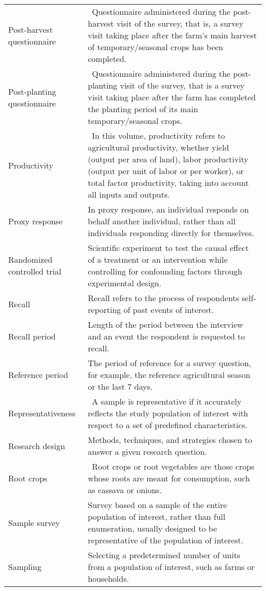 \documentclass[
]{book}
\begin{document}
\begin{longtable}[]{@{}ll@{}}
Post-harvest questionnaire & ~Questionnaire administered during the post-harvest visit of the survey, that is, a survey visit taking place after the farm's main harvest of temporary/seasonal crops has been completed. \\
Post-planting questionnaire & ~Questionnaire administered during the post-planting visit of the survey, that is a survey visit taking place after the farm has completed the planting period of its main temporary/seasonal crops. \\
Productivity & ~In this volume, productivity refers to agricultural productivity, whether yield (output per area of land), labor productivity (output per unit of labor or per worker), or total factor productivity, taking into account all inputs and outputs. \\
Proxy response & In proxy response, an individual responds on behalf another individual, rather than all individuals responding directly for themselves. \\
Randomized controlled trial & Scientific experiment to test the causal effect of a treatment or an intervention while controlling for confounding factors through experimental design. \\
Recall & Recall refers to the process of respondents self-reporting of past events of interest. \\
Recall period & Length of the period between the interview and an event the respondent is requested to recall. \\
Reference period & The period of reference for a survey question, for example, the reference agricultural season or the last 7 days. \\
Representativeness & ~A sample is representative if it accurately reflects the study population of interest with respect to a set of predefined characteristics. \\
Research design & Methods, techniques, and strategies chosen to answer a given research question. \\
Root crops & ~Root crops or root vegetables are those crops whose roots are meant for consumption, such as cassava or onions. \\
Sample survey & Survey based on a sample of the entire population of interest, rather than full enumeration, usually designed to be representative of the population of interest. \\
Sampling & Selecting a predetermined number of units from a population of interest, such as farms or households. \\

\end{longtable}
\end{document}
